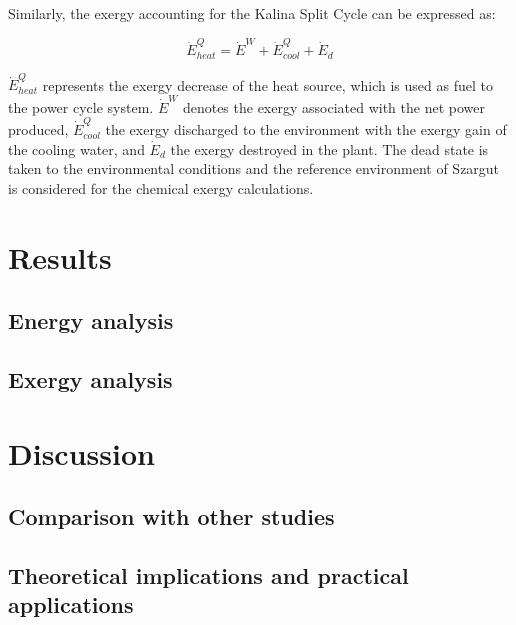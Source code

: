 \documentclass[final,times,5p]{elsarticle}
\begin{document}
	Similarly, the exergy accounting for the Kalina Split Cycle can be expressed as:

	\begin{equation}
		\dot{E}^{Q}_{heat}=\dot{E}^{W}+\dot{E}^{Q}_{cool}+\dot{E}_{d}
	\end{equation}

	$\dot{E}^{Q}_{heat}$ represents the exergy decrease of the heat source, which is used as fuel to the power cycle system. $\dot{E}^{W}$ denotes the exergy associated with the net power produced, $\dot{E}^{Q}_{cool}$ the exergy discharged to the environment with the exergy gain of the cooling water, and $\dot{E}_{d}$ the exergy destroyed in the plant. The dead state is taken to the environmental conditions and the reference environment of Szargut \cite{Szargut1998} is considered for the chemical exergy calculations.
	

		

\section{Results}
\label{sec:results}

\subsection{Energy analysis}

\subsection{Exergy analysis}


\section{Discussion}
\label{sec:discussion}

	\subsection{Comparison with other studies}

	\subsection{Theoretical implications and practical applications}
\end{document}

